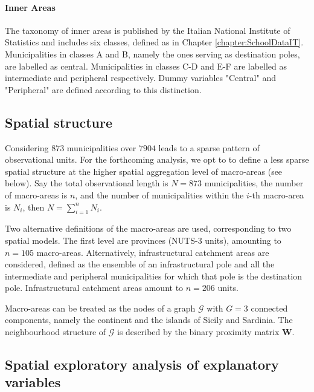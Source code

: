 \documentclass[openany]{book}
\begin{document}
\paragraph{Inner Areas}\label{par:inner} The taxonomy of inner areas is published by the Italian National Institute of Statistics \citep{InnerAreas} and includes six classes, defined as in Chapter \ref{chapter:SchoolDataIT}. Municipalities in classes A and B, namely the ones serving as destination poles, are labelled as central. Municipalities in classes C-D and E-F are labelled as intermediate and peripheral respectively. Dummy variables "Central" and "Peripheral" are defined according to this distinction.

\subsection{Spatial structure} \label{par:graph}
Considering $873$ municipalities over $7904$ leads to a sparse pattern of observational units. For the forthcoming analysis, we opt to to define a less sparse spatial structure at the higher spatial aggregation level of macro-areas (see below). Say the total observational length is $N = 873$ municipalities, the number of macro-areas is $n$, and the number of municipalities within the $i$-th macro-area is $N_i$, then $N = \sum_{i=1}^{n} N_i$.

Two alternative definitions of the macro-areas are used, corresponding to two spatial models. The first level are provinces (NUTS-3 units), amounting to $n = 105$ macro-areas. Alternatively, infrastructural catchment areas are considered, defined as the ensemble of an infrastructural pole and all the intermediate and peripheral municipalities for which that pole is the destination pole. Infrastructural catchment areas amount to $n = 206$ units.

Macro-areas can be treated as the nodes of a graph $\mathcal{G}$ with $G = 3$ connected components, namely the continent and the islands of Sicily and Sardinia. The neighbourhood structure of $\mathcal{G}$ is described by the binary proximity matrix $\mathbf{W}$.

\subsection{Spatial exploratory analysis of explanatory variables} \label{par:X}
\end{document}
